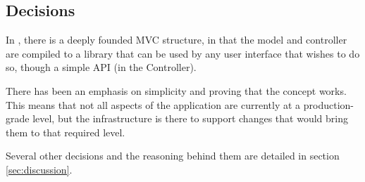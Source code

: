 \subsection{Decisions}

In \SOP{}, there is a deeply founded MVC structure, in that the model and controller are
compiled to a library that can be used by any user interface that wishes to do so, though a
simple API (in the Controller).

There has been an emphasis on simplicity and proving that the concept works. This means that
not all aspects of the application are currently at a production-grade level, but the infrastructure
is there to support changes that would bring them to that required level.

Several other decisions and the reasoning behind them are detailed in section \ref{sec:discussion}.
